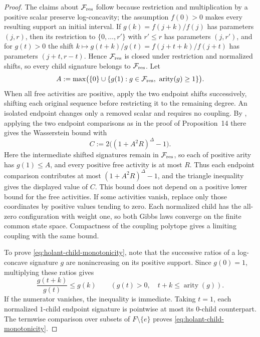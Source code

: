 \documentclass[11pt,reqno]{article}
\theoremstyle{plain}
\theoremstyle{definition}
\theoremstyle{remark}
\theoremstyle{definition}
\theoremstyle{remark}
\newcommand{\Deg}{\Delta}                        %
\begin{document}
\begin{proof}
The claims about \(\mathcal F_{\rm res}\) follow because restriction and
multiplication by a positive scalar preserve log-concavity; the assumption
\(f(0)>0\) makes every resulting support an initial interval.  If
\(g(k)=f(j+k)/f(j)\) has parameters \((j,r)\), then its restriction to
\(\{0,\ldots,r'\}\) with \(r'\le r\) has parameters \((j,r')\), and for
\(g(t)>0\) the shift \(k\mapsto g(t+k)/g(t)=f(j+t+k)/f(j+t)\) has
parameters \((j+t,r-t)\).  Hence \(\mathcal F_{\rm res}\) is closed under
restriction and normalized shifts, so every child signature belongs to
\(\mathcal F_{\rm res}\).  Let
\[
  A:=\max\bigl(\{0\}\cup
       \{g(1):g\in\mathcal F_{\rm res},\
                  \operatorname{arity}(g)\ge1\}\bigr).
\]
When all free activities are positive, apply the two endpoint shifts
successively, shifting each original sequence before restricting it to
the remaining degree.  An isolated endpoint changes only a removed
scalar and requires no coupling.
By \cite[Proposition~17 and Lemma~21]{ChenGu2023}, applying the two
endpoint comparisons as in the proof of Proposition~14 there gives the
Wasserstein bound with
\[
  C:=2\bigl((1+A^2R)^\Deg-1\bigr).
\]
Here the intermediate shifted signatures remain in
\(\mathcal F_{\rm res}\), so each of positive arity has \(g(1)\le A\), and
every positive free activity is at most \(R\).  Thus each endpoint
comparison contributes at most \((1+A^2R)^\Deg-1\), and the triangle
inequality gives the displayed value of \(C\).  This bound does not
depend on a positive lower bound for the free activities.
If some activities vanish, replace only those
coordinates by positive values tending to zero.  Each normalized child
has the all-zero configuration with weight one, so both Gibbs laws
converge on the finite common state space.  Compactness of the coupling
polytope gives a limiting coupling with the same bound.

To prove \eqref{eq:holant-child-monotonicity}, note that the successive
ratios of a log-concave
signature \(g\) are nonincreasing on its positive support.  Since
\(g(0)=1\), multiplying these ratios gives
\begin{equation}\label{eq:holant-shift-monotonicity}
  \frac{g(t+k)}{g(t)}\le g(k)
  \qquad(g(t)>0,\quad t+k\le\operatorname{arity}(g)).
\end{equation}
If the numerator vanishes, the inequality is immediate.
Taking \(t=1\), each normalized \(1\)-child endpoint signature is
pointwise at most its \(0\)-child counterpart.  The termwise comparison over
subsets of \(F\setminus\{e\}\) proves
\eqref{eq:holant-child-monotonicity}.
\end{proof}
\end{document}

